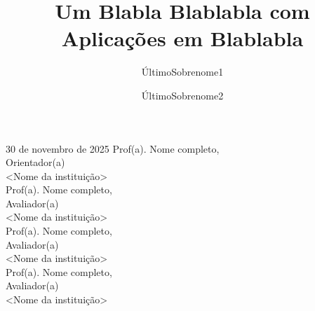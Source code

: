 \documentclass[tcc,capa]{texifsap}
\title{Um Blabla Blablabla com Aplicações em Blablabla}
\author{ÚltimoSobrenome1}{Primeiro nome e sobrenome}
\author{ÚltimoSobrenome2}{Primeiro nome e sobrenome}                   %
\begin{document}





\maketitle

\sloppy

\fichacatalografica


\begin{aprovacao}{30 de novembro de 2025} %
\noindent Prof(a). Nome completo,\\
Orientador(a)\\
<Nome da instituição>\\[1cm]
\noindent Prof(a). Nome completo,\\
Avaliador(a)\\
<Nome da instituição>\\[1cm]
\noindent Prof(a). Nome completo,\\
Avaliador(a)\\
<Nome da instituição>\\[1cm]
\noindent Prof(a). Nome completo,\\
Avaliador(a)\\
<Nome da instituição>\\[1cm]
\end{aprovacao}
\end{document}
